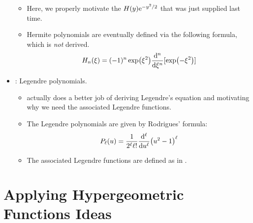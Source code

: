 \documentclass[../finalProject.tex]{subfiles}
\begin{document}
\begin{itemize}
    \begin{itemize}
        \item Here, we properly motivate the $H(y)\e[-y^2/2]$ that was just supplied last time.
        \item Hermite polynomials are eventually defined via the following formula, which is \emph{not} derived.
        \begin{equation*}
            H_n(\xi) = (-1)^n\exp(\xi^2)\dv[n]{\xi}[\exp(-\xi^2)]
        \end{equation*}
    \end{itemize}
    \item \textcite[65-66]{bib:PHYS23410Notes}: Legendre polynomials.
    \begin{itemize}
        \item \textcite{bib:CHEM26100Notes} actually does a better job of deriving Legendre's equation and motivating why we need the associated Legendre functions.
        \item The Legendre polynomials are given by Rodrigues' formula:
        \begin{equation*}
            P_\ell(u) = \frac{1}{2^\ell\ell!}\dv[\ell]{u}(u^2-1)^\ell
        \end{equation*}
        \item The associated Legendre functions are defined as in \textcite{bib:CHEM26100Notes}.
    \end{itemize}
\end{itemize}


\section*{Applying Hypergeometric Functions Ideas}
\end{document}
